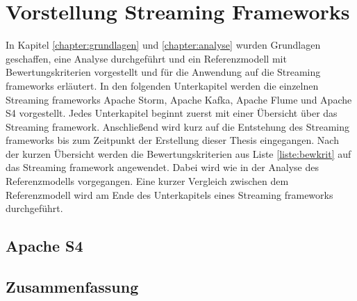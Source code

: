 \chapter{Vorstellung Streaming Frameworks}
\label{chapter:vorstellung}

In Kapitel \ref{chapter:grundlagen} und \ref{chapter:analyse} wurden Grundlagen geschaffen, eine Analyse durchgeführt und ein Referenzmodell mit Bewertungskriterien vorgestellt und für die Anwendung auf die Streaming frameworks erläutert. In den folgenden Unterkapitel werden die einzelnen Streaming frameworks Apache Storm, Apache Kafka, Apache Flume und Apache S4 vorgestellt. Jedes Unterkapitel beginnt zuerst mit einer Übersicht über das Streaming framework. Anschließend wird kurz auf die Entstehung des Streaming frameworks bis zum Zeitpunkt der Erstellung dieser Thesis eingegangen. Nach der kurzen Übersicht werden die Bewertungskriterien aus Liste \ref{liste:bewkrit} auf das Streaming framework angewendet. Dabei wird wie in der Analyse des Referenzmodells vorgegangen. Eine kurzer Vergleich zwischen dem Referenzmodell wird am Ende des Unterkapitels eines Streaming frameworks durchgeführt.








\section{Apache S4}
\section{Zusammenfassung}